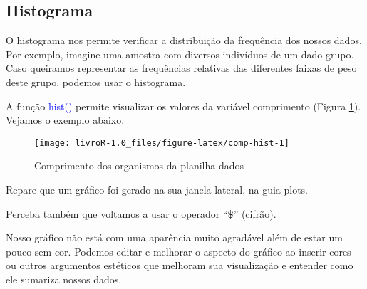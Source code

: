 \documentclass[14pt,titlepage, oneside, openany, a4paper]{book}
\newenvironment{Shaded}{\begin{snugshade}}{\end{snugshade}}
\newcommand{\DataTypeTok}[1]{\textcolor[rgb]{0.13,0.29,0.53}{#1}}
\newcommand{\DecValTok}[1]{\textcolor[rgb]{0.00,0.00,0.81}{#1}}
\newcommand{\KeywordTok}[1]{\textcolor[rgb]{0.13,0.29,0.53}{\textbf{#1}}}
\newcommand{\NormalTok}[1]{#1}
\newcommand{\OperatorTok}[1]{\textcolor[rgb]{0.81,0.36,0.00}{\textbf{#1}}}
\newcommand{\StringTok}[1]{\textcolor[rgb]{0.31,0.60,0.02}{#1}}
\begin{document}
\hypertarget{histograma}{%
\subsection{Histograma}\label{histograma}}

O histograma nos permite verificar a distribuição da frequência dos nossos dados. Por exemplo, imagine uma amostra com diversos indivíduos de um dado grupo. Caso queiramos representar as frequências relativas das diferentes faixas de peso deste grupo, podemos usar o histograma.

A função \textcolor{blue}{hist()} permite visualizar os valores da variável comprimento (Figura \ref{fig:comp-hist}). Vejamos o exemplo abaixo.

\begin{Shaded}
\end{Shaded}

\begin{figure}[H]

{\centering \texttt{[image: livroR-1.0\_files/figure-latex/comp-hist-1]} 

}

\caption{Comprimento dos organismos da planilha dados}\label{fig:comp-hist}
\end{figure}

Repare que um gráfico foi gerado na sua janela lateral, na guia plots.

Perceba também que voltamos a usar o operador ``\textbf{\$}'' (cifrão).

Nosso gráfico não está com uma aparência muito agradável além de estar um pouco sem cor. Podemos editar e melhorar o aspecto do gráfico ao inserir cores ou outros argumentos estéticos que melhoram sua visualização e entender como ele sumariza nossos dados.

\begin{Shaded}
\end{Shaded}
\end{document}
